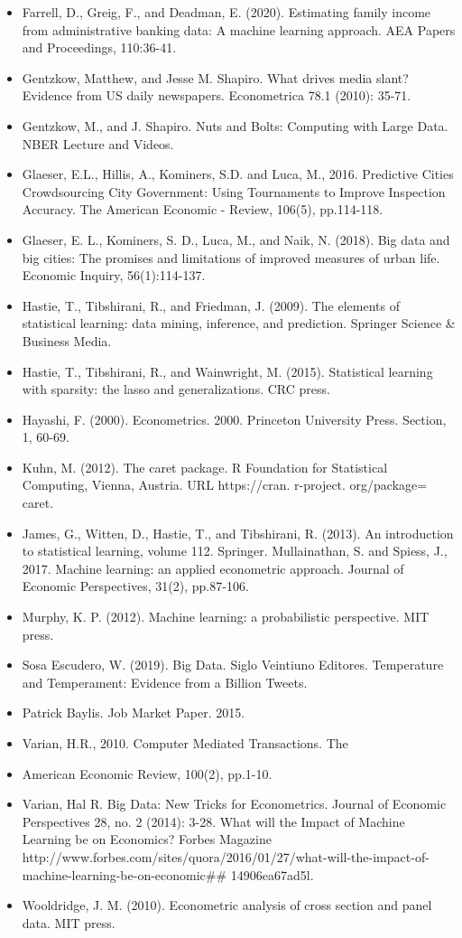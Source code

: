 \documentclass[11pt]{article}
\begin{document}
\begin{itemize}
\item Farrell, D., Greig, F., and Deadman, E. (2020). Estimating family income from administrative banking data: A machine learning approach. AEA Papers and Proceedings, 110:36-41.
\item Gentzkow, Matthew, and Jesse M. Shapiro. What drives media slant? Evidence from US daily newspapers. Econometrica 78.1 (2010): 35-71.
\item Gentzkow, M., and J. Shapiro. Nuts and Bolts: Computing with Large Data. NBER Lecture and Videos.
\item Glaeser, E.L., Hillis, A., Kominers, S.D. and Luca, M., 2016. Predictive Cities Crowdsourcing City Government: Using Tournaments to Improve Inspection Accuracy. The American Economic - Review, 106(5), pp.114-118.
\item Glaeser, E. L., Kominers, S. D., Luca, M., and Naik, N. (2018). Big data and big cities: The promises and limitations of improved measures of urban life. Economic Inquiry, 56(1):114-137.
\item Hastie, T., Tibshirani, R., and Friedman, J. (2009). The elements of statistical learning: data mining, inference, and prediction. Springer Science \& Business Media.
\item Hastie, T., Tibshirani, R., and Wainwright, M. (2015). Statistical learning with sparsity: the lasso and generalizations. CRC press.
\item Hayashi, F. (2000). Econometrics. 2000. Princeton University Press. Section, 1, 60-69.
\item Kuhn, M. (2012). The caret package. R Foundation for Statistical Computing, Vienna, Austria. URL https://cran. r-project. org/package= caret.
\item James, G., Witten, D., Hastie, T., and Tibshirani, R. (2013). An introduction to statistical learning, volume 112. Springer.
Mullainathan, S. and Spiess, J., 2017. Machine learning: an applied econometric approach. Journal of Economic Perspectives, 31(2), pp.87-106.
\item Murphy, K. P. (2012). Machine learning: a probabilistic perspective. MIT press.
\item Sosa Escudero, W. (2019). Big Data. Siglo Veintiuno Editores.
Temperature and Temperament: Evidence from a Billion Tweets.
\item Patrick Baylis. Job Market Paper. 2015.
\item Varian, H.R., 2010. Computer Mediated Transactions. The \item American Economic Review, 100(2), pp.1-10.
\item Varian, Hal R. Big Data: New Tricks for Econometrics. Journal of Economic Perspectives 28, no. 2 (2014): 3-28.
What will the Impact of Machine Learning be on Economics? Forbes Magazine http://www.forbes.com/sites/quora/2016/01/27/what-will-the-impact-of-machine-learning-be-on-economic\#\# 14906ea67ad5l.
\item Wooldridge, J. M. (2010). Econometric analysis of cross section and panel data. MIT press.

\end{itemize}
\end{document}
